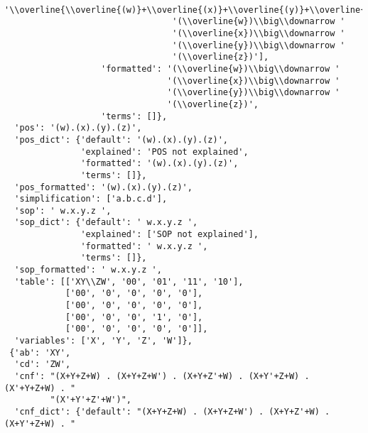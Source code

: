 \begin{verbatim}
                                 '\\overline{\\overline{(w)}+\\overline{(x)}+\\overline{(y)}+\\overline{(z)}}',
                                 '(\\overline{w})\\big\\downarrow '
                                 '(\\overline{x})\\big\\downarrow '
                                 '(\\overline{y})\\big\\downarrow '
                                 '(\\overline{z})'],
                   'formatted': '(\\overline{w})\\big\\downarrow '
                                '(\\overline{x})\\big\\downarrow '
                                '(\\overline{y})\\big\\downarrow '
                                '(\\overline{z})',
                   'terms': []},
  'pos': '(w).(x).(y).(z)',
  'pos_dict': {'default': '(w).(x).(y).(z)',
               'explained': 'POS not explained',
               'formatted': '(w).(x).(y).(z)',
               'terms': []},
  'pos_formatted': '(w).(x).(y).(z)',
  'simplification': ['a.b.c.d'],
  'sop': ' w.x.y.z ',
  'sop_dict': {'default': ' w.x.y.z ',
               'explained': ['SOP not explained'],
               'formatted': ' w.x.y.z ',
               'terms': []},
  'sop_formatted': ' w.x.y.z ',
  'table': [['XY\\ZW', '00', '01', '11', '10'],
            ['00', '0', '0', '0', '0'],
            ['00', '0', '0', '0', '0'],
            ['00', '0', '0', '1', '0'],
            ['00', '0', '0', '0', '0']],
  'variables': ['X', 'Y', 'Z', 'W']},
 {'ab': 'XY',
  'cd': 'ZW',
  'cnf': "(X+Y+Z+W) . (X+Y+Z+W') . (X+Y+Z'+W) . (X+Y'+Z+W) . (X'+Y+Z+W) . "
         "(X'+Y'+Z'+W')",
  'cnf_dict': {'default': "(X+Y+Z+W) . (X+Y+Z+W') . (X+Y+Z'+W) . (X+Y'+Z+W) . "

\end{verbatim}
